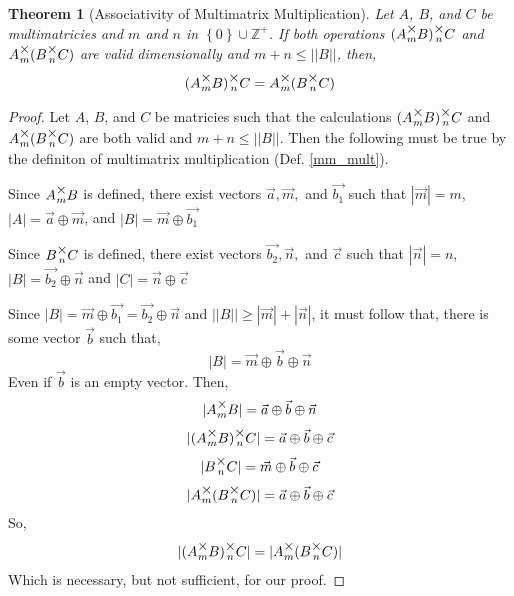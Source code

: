 \documentclass[12pt]{article}
\theoremstyle{definition}
\theoremstyle{plain}
\newtheorem{theorem}{Theorem}[section]
\theoremstyle{ppart}
\newcommand{\mmult}[1]{\text{\raisebox{1ex}{$\underset{#1}{\times}$}}}
\begin{document}
\begin{theorem}[Associativity of Multimatrix Multiplication]
\label{mm_associativity}
Let $A$, $B$, and $C$ be multimatricies and $m$ and $n$ in
$\left\{ 0 \right\} \cup \mathbb{Z}^{+}$.
If both operations $(A \mmult{m} B) \mmult{n} C$ and $A \mmult{m} (B \mmult{n} C)$
are valid dimensionally and $m+n \le ||B||$, then,
\[ (A \mmult{m} B) \mmult{n} C = A \mmult{m} (B \mmult{n} C) \]
\end{theorem}
\begin{proof}
Let $A$, $B$, and $C$ be matricies such that the calculations
$(A \mmult{m} B) \mmult{n} C$ and $A \mmult{m} (B \mmult{n} C)$ are both valid
and $m + n \le ||B||$.
Then the following must be true by the definiton of multimatrix multiplication
(Def. \ref{mm_mult}).

Since $A \mmult{m} B$ is defined, there exist vectors $\vec{a}, \vec{m},$ and
$\vec{b_1}$ such that 
$|\vec{m}| = m$,
$|A| = \vec{a} \oplus \vec{m}$,
and
$|B| = \vec{m} \oplus \vec{b_1}$

Since $B \mmult{n} C$ is defined, there exist vectors $\vec{b_2}, \vec{n},$ and
$\vec{c}$ such that
$|\vec{n}| = n$,
$|B| = \vec{b_2} \oplus \vec{n}$
and
$|C| = \vec{n} \oplus \vec{c}$

Since $|B| = \vec{m} \oplus \vec{b_1} = \vec{b_2} \oplus \vec{n}$ and
$||B|| \ge |\vec{m}| + |\vec{n}|$, it must follow that, there is some vector $\vec{b}$
such that,
\[
 |B| = \vec{m} \oplus \vec{b} \oplus \vec{n}
\]
Even if $\vec{b}$ is an empty vector. Then,
\[ |A \mmult{m} B| = \vec{a} \oplus \vec{b} \oplus \vec{n} \]
\[ |(A \mmult{m} B) \mmult{n} C| = \vec{a} \oplus \vec{b} \oplus \vec{c} \]
\[ |B \mmult{n} C| = \vec{m} \oplus \vec{b} \oplus \vec{c} \]
\[ |A \mmult{m} (B \mmult{n} C)| = \vec{a} \oplus \vec{b} \oplus \vec{c} \]
So,
\[ |(A \mmult{m} B) \mmult{n} C| = |A \mmult{m} (B \mmult{n} C)| \]
Which is necessary, but not sufficient, for our proof.


\end{proof}
\end{document}

